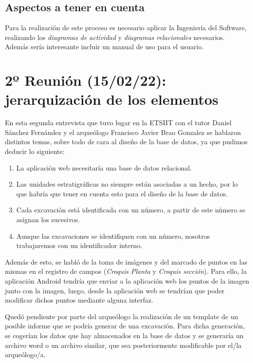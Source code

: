    \subsection{Aspectos a tener en cuenta}
    Para la realización de este proceso es necesario aplicar la Ingeniería del Software,
    realizando los \textit{diagramas de actividad} y \textit{diagramas relacionales} necesarios.
    Además sería interesante incluir un manual de uso para el usuario.

\section{2º Reunión (15/02/22): jerarquización de los elementos}
En esta segunda entrevista que tuvo lugar en la ETSIIT con el tutor Daniel Sánchez Fernández
y el arqueólogo Francisco Javier Brao Gonzalez se hablaron distintos temas, sobre todo de cara
al diseño de la base de datos, ya que pudimos deducir lo siguiente:

    \begin{enumerate}
        \item La aplicación web necesitaría una base de datos relacional.
        \item Las unidades estratigráficas no siempre están asociadas a un hecho, por lo
        que habría que tener en cuenta esto para el diseño de la base de datos.
        \item Cada excavación está identificada con un número, a partir de este número
        se asignan los sucesivos.
        \item Aunque las excavaciones se identifiquen con un número, nosotros trabajaremos
        con un identificador interno.
    \end{enumerate}

Además de esto, se habló de la toma de imágenes y del marcado de puntos en las mismas en el
registro de campos (\textit{Croquis Planta} y \textit{Croquis sección}). Para ello, la
aplicación Android tendría que enviar a la aplicación web los puntos de la imagen junto con
la imagen, luego, desde la aplicación web se tendrían que poder modificar dichos puntos mediante
alguna interfaz. 

Quedó pendiente por parte del arqueólogo la realización de un template de un posible informe
que se podría generar de una excavación. Para dicha generación, se cogerían los datos
que hay almacenados en la base de datos y se generaría un archivo word o un archivo similar,
que sea posteriormente modificable por el/la arqueólogo/a.


